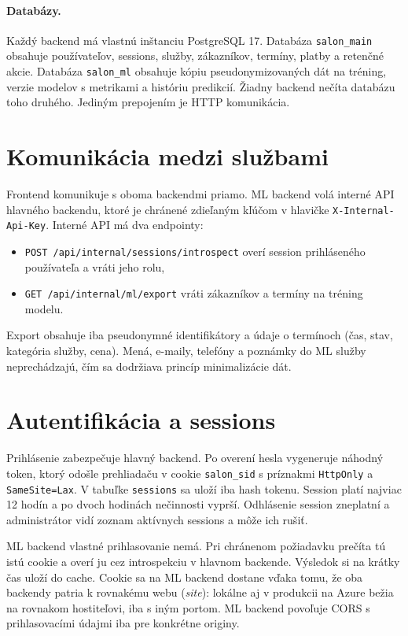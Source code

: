 \paragraph{Databázy.} Každý backend má vlastnú inštanciu PostgreSQL 17. Databáza \texttt{salon\_main} obsahuje používateľov, sessions, služby, zákazníkov, termíny, platby a retenčné akcie. Databáza \texttt{salon\_ml} obsahuje kópiu pseudonymizovaných dát na tréning, verzie modelov s metrikami a históriu predikcií. Žiadny backend nečíta databázu toho druhého. Jediným prepojením je HTTP komunikácia.

\section{Komunikácia medzi službami}

Frontend komunikuje s oboma backendmi priamo. ML backend volá interné API hlavného backendu, ktoré je chránené zdieľaným kľúčom v hlavičke \texttt{X-Internal-Api-Key}. Interné API má dva endpointy:

\begin{itemize}
  \item \nolinkurl{POST /api/internal/sessions/introspect} overí session prihláseného používateľa a vráti jeho rolu,
  \item \nolinkurl{GET /api/internal/ml/export} vráti zákazníkov a termíny na tréning modelu.
\end{itemize}

Export obsahuje iba pseudonymné identifikátory a údaje o termínoch (čas, stav, kategória služby, cena). Mená, e-maily, telefóny a poznámky do ML služby neprechádzajú, čím sa dodržiava princíp minimalizácie dát.

\section{Autentifikácia a sessions}

Prihlásenie zabezpečuje hlavný backend. Po overení hesla vygeneruje náhodný token, ktorý odošle prehliadaču v cookie \texttt{salon\_sid} s príznakmi \texttt{HttpOnly} a \texttt{SameSite=Lax}. V tabuľke \texttt{sessions} sa uloží iba hash tokenu. Session platí najviac 12 hodín a po dvoch hodinách nečinnosti vyprší. Odhlásenie session zneplatní a administrátor vidí zoznam aktívnych sessions a môže ich rušiť.

ML backend vlastné prihlasovanie nemá. Pri chránenom požiadavku prečíta tú istú cookie a overí ju cez introspekciu v hlavnom backende. Výsledok si na krátky čas uloží do cache. Cookie sa na ML backend dostane vďaka tomu, že oba backendy patria k rovnakému webu (\emph{site}): lokálne aj v produkcii na Azure bežia na rovnakom hostiteľovi, iba s iným portom. ML backend povoľuje CORS s prihlasovacími údajmi iba pre konkrétne originy.

